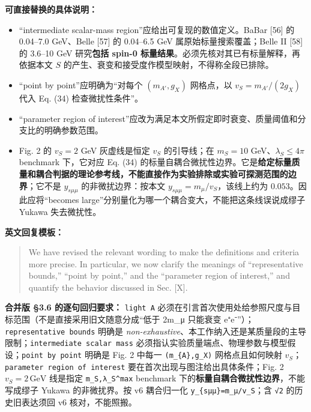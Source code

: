 \documentclass[
]{article}
\providecommand{\tightlist}{%
  \setlength{\itemsep}{0pt}\setlength{\parskip}{0pt}}
\begin{document}
\textbf{可直接替换的具体说明：}

\begin{itemize}
\tightlist
\item
  ``intermediate scalar-mass region''应给出可复现的数值定义。BaBar
  {[}56{]} 的 0.04--7.0 GeV、Belle {[}57{]} 的 0.04--6.5 GeV
  属原始标量搜索覆盖；Belle II {[}58{]} 的 3.6--10 GeV 研究\textbf{包括
  spin-0 标量结果}。必须先核对其已有标量解释，再依据本文 \(S\)
  的产生、衰变和接受度作模型映射，不得称全段已排除。
\item
  ``point by point''应明确为``对每个 \((m_{A'},g_X)\) 网格点，以
  \(v_S=m_{A'}/(2g_X)\) 代入 Eq. (34) 检查微扰性条件''。
\item
  ``parameter region of
  interest''应改为满足本文所假定即时衰变、质量阈值和分支比的明确参数范围。
\item
  Fig. 2 的 \(v_S=2\) GeV 灰虚线是恒定 \(v_S\) 的引导线；在 \(m_S=10\)
  GeV、\(\lambda_S\le4\pi\) benchmark 下，它对应 Eq. (34)
  的标量自耦合微扰性边界。它是\textbf{给定标量质量和耦合判据的理论参考线，不能直接作为实验排除或实验可探测范围的边界}；它不是
  \(y_{s\mu\mu}\) 的非微扰边界：按本文
  \(y_{s\mu\mu}=m_\mu/v_S\)，该线上约为 \(0.053\)。因此应将``becomes
  large''分别量化为哪一个耦合变大，不能把这条线误说成缪子 Yukawa
  失去微扰性。
\end{itemize}

\textbf{英文回复模板：}

\begin{quote}
We have revised the relevant wording to make the definitions and
criteria more precise. In particular, we now clarify the meanings of
``representative bounds,'' ``point by point,'' and the ``parameter
region of interest,'' and quantify the behavior discussed in Sec.
{[}X{]}.
\end{quote}

\textbf{合并版 §3.6 的逐句回归要求：}
\texttt{light\ A\textquotesingle{}}
必须在引言首次使用处给参照尺度与目标范围（不是直接采用旧文随意分成``低于
2m\_μ 只能衰变 e⁺e⁻''）；\texttt{representative\ bounds} 明确是
\emph{non-exhaustive}、本工作纳入还是某质量段的主导限制；\texttt{intermediate\ scalar\ mass}
必须指认实验质量端点、物理参数与模型假设；\texttt{point\ by\ point}
明确是 Fig. 2 中每一 \texttt{(m\_\{A\textquotesingle{}\},g\_X)}
网格点且如何映射 \(v_S\)；\texttt{parameter\ region\ of\ interest}
要在首次出现与图注给出具体条件；Fig. 2 \(v_S=2\,\mathrm{GeV}\) 线是指定
\texttt{m\_S,λ\_S\^{}max} benchmark
下的\textbf{标量自耦合微扰性边界}，不能写成缪子 Yukawa 的非微扰界。按 v6
耦合归一化 \texttt{y\_\{sμμ\}=m\_μ/v\_S}；含 \texttt{√2}
的历史旧表达须回 v6 核对，不能照搬。
\end{document}
